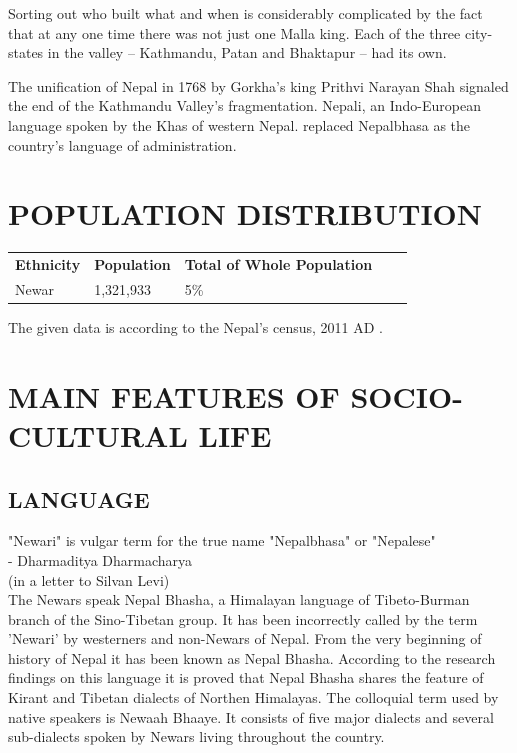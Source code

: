 \documentclass[a4paper,13pt, margin=0.9in]{article}
\begin{document}
\begin{flushleft}
Sorting out who built what and when is considerably complicated by the fact that at any one time there was not just one Malla king. Each of the three city-states in the valley – Kathmandu, Patan and Bhaktapur – had its own.
\vskip0.5cm 

The unification of Nepal in 1768 by Gorkha's king Prithvi Narayan Shah signaled the end of the Kathmandu Valley's fragmentation. Nepali, an Indo-European language spoken by the Khas of western Nepal. replaced Nepalbhasa as the country's language of administration.

\newpage
\section{POPULATION DISTRIBUTION}
	
\begin{table}[htb]
\centering
\begin{tabular}{lllll}
\cline{1-3}

\multicolumn{1}{|l|}{\textbf{Ethnicity}} & \multicolumn{1}{l|}{\textbf{Population}} & \multicolumn{1}{l|}{\textbf{Total of Whole Population}} &  &  \\ \cline{1-3} 
\multicolumn{1}{|l|}{Newar}     & \multicolumn{1}{l|}{1,321,933}  & \multicolumn{1}{l|}{5\%}   &  &  \\ \cline{1-3} 
\end{tabular}
\end{table}

The given data is according to the Nepal's census, 2011 AD .


\newpage
\section{MAIN FEATURES OF SOCIO-CULTURAL LIFE}
\subsection{LANGUAGE}


"Newari" is vulgar term for the true name "Nepalbhasa" or "Nepalese" \\
- Dharmaditya Dharmacharya \\
(in a letter to Silvan Levi) \\

The Newars speak Nepal Bhasha, a Himalayan language of Tibeto-Burman branch of the Sino-Tibetan group. It has been incorrectly called by the term 'Newari' by westerners and non-Newars of Nepal. From the very beginning of history of Nepal it has been known as Nepal Bhasha. According to the research findings on this language it is proved that Nepal Bhasha shares the feature of Kirant and Tibetan dialects of Northen Himalayas. The colloquial term used by native speakers is Newaah Bhaaye. It consists of five major dialects and several sub-dialects spoken by Newars living throughout the country. \\


\end{flushleft}
\end{document}
